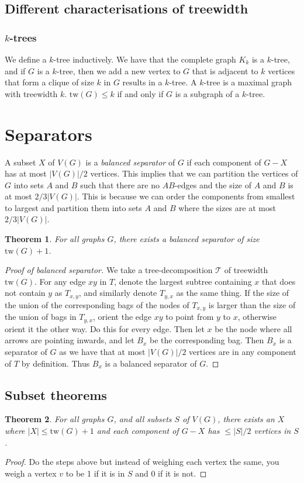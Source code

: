 \documentclass[]{article}
\newcommand{\tree}{\mathcal{T}}
\newcommand{\tw}{\text{tw}}
\newtheorem{theorem}{Theorem}
\theoremstyle{definition}
\numberwithin{theorem}{section}
\numberwithin{equation}{section}
\begin{document}
\subsection{Different characterisations of treewidth}
\subsubsection{$k$-trees}
We define a $k$-tree inductively. We have that the complete graph $K_k$ is a $k$-tree, and if $G$ is a $k$-tree, then we add a new vertex to $G$ that is adjacent to $k$ vertices that form a clique of size $k$ in $G$ results in a $k$-tree. 
A $k$-tree is a maximal graph with treewidth $k$. $\tw(G) \leq k$ if and only if $G$ is a subgraph of a $k$-tree. 

\section{Separators}
A subset $X$ of $V(G)$ is a \textit{balanced separator} of $G$ if each component of $G - X$ has at most $|V(G)|/2$ vertices. This implies that we can partition the vertices of $G$ into sets $A$ and $B$ such that there are no $AB$-edges and the size of $A$ and $B$ is at most $2/3 |V(G)|$. This is because we can order the components from smallest to largest and partition them into sets $A$ and $B$ where the sizes are at most $2/3 |V(G)|$.

\begin{theorem}
	For all graphs $G$, there exists a balanced separator of size $\tw(G) + 1$. 
\end{theorem}
\begin{proof}[Proof of balanced separator]
	We take a tree-decomposition $\tree$ of treewidth $\tw(G)$. For any edge $xy$ in $T$, denote the largest subtree containing $x$ that does not contain $y$ as $T_{x,y}$, and similarly denote $T_{y, x}$ as the same thing. If the size of the union of the corresponding bags of the nodes of $T_{x,y}$ is larger than the size of the union of bags in $T_{y, x}$, orient the edge $xy$ to point from $y$ to $x$, otherwise orient it the other way. Do this for every edge. Then let $x$ be the node where all arrows are pointing inwards, and let $B_x$ be the corresponding bag. Then $B_x$ is a separator of $G$ as we have that at most $|V(G)|/2$ vertices are in any component of $T$ by definition. Thus $B_x$ is a balanced separator of $G$. 
\end{proof}

\subsection{Subset theorems}
\begin{theorem}
	For all graphs $G$, and all subsets $S$ of $V(G)$, there exists an $X$ where $|X| \leq \tw(G) + 1$ and each component of $G - X$ has $\leq |S|/2$ vertices in $S$. 
\end{theorem}
\begin{proof}
	Do the steps above but instead of weighing each vertex the same, you weigh a vertex $v$ to be 1 if it is in $S$ and 0 if it is not. 
\end{proof}
\end{document}
